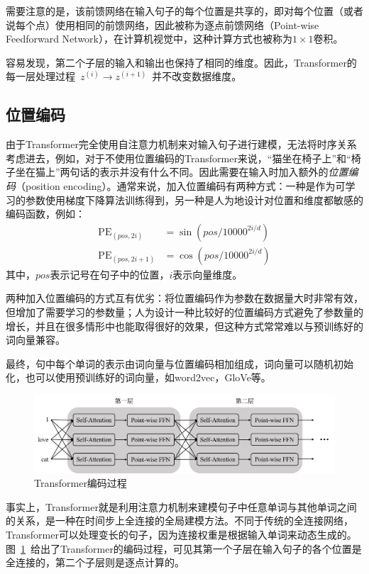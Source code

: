 需要注意的是，该前馈网络在输入句子的每个位置是共享的，即对每个位置（或者说每个点）使用相同的前馈网络，因此被称为逐点前馈网络（Point-wise Feedforward Network），在计算机视觉中，这种计算方式也被称为$1\times 1$卷积。

容易发现，第二个子层的输入和输出也保持了相同的维度。因此，Transformer的每一层处理过程~$z^{(i)} \to z^{(i+1)}$~并不改变数据维度。
\subsection{位置编码}
由于Transformer完全使用自注意力机制来对输入句子进行建模，无法将时序关系考虑进去，例如，对于不使用位置编码的Transformer来说，“猫坐在椅子上”和“椅子坐在猫上”两句话的表示并没有什么不同。因此需要在输入时加入额外的\emph{位置编码}（position encoding）。通常来说，加入位置编码有两种方式：一种是作为可学习的参数使用梯度下降算法训练得到，另一种是人为地设计对位置和维度都敏感的编码函数，例如：
\begin{align}
	\mathrm{PE}_{(pos, 2i)} &= \sin(pos/10000^{2i/d}) \\
	\mathrm{PE}_{(pos, 2i+1)} &= \cos(pos/10000^{2i/d})
\end{align}
其中，$pos$表示记号在句子中的位置，$i$表示向量维度。

两种加入位置编码的方式互有优劣：将位置编码作为参数在数据量大时非常有效，但增加了需要学习的参数量；人为设计一种比较好的位置编码方式避免了参数量的增长，并且在很多情形中也能取得很好的效果，但这种方式常常难以与预训练好的词向量兼容。

最终，句中每个单词的表示由词向量与位置编码相加组成，词向量可以随机初始化，也可以使用预训练好的词向量，如word2vec，GloVe等。

\begin{figure}[htb]
	\centering
	\includegraphics[scale=0.46]{tf_s.png}
	\caption{Transformer编码过程}
	\label{fig:tf_s}
\end{figure}

事实上，Transformer就是利用注意力机制来建模句子中任意单词与其他单词之间的关系，是一种在时间步上全连接的全局建模方法。不同于传统的全连接网络，Transformer可以处理变长的句子，因为连接权重是根据输入单词来动态生成的。图~\ref{fig:tf_s}~给出了Transformer的编码过程，可见其第一个子层在输入句子的各个位置是全连接的，第二个子层则是逐点计算的。

